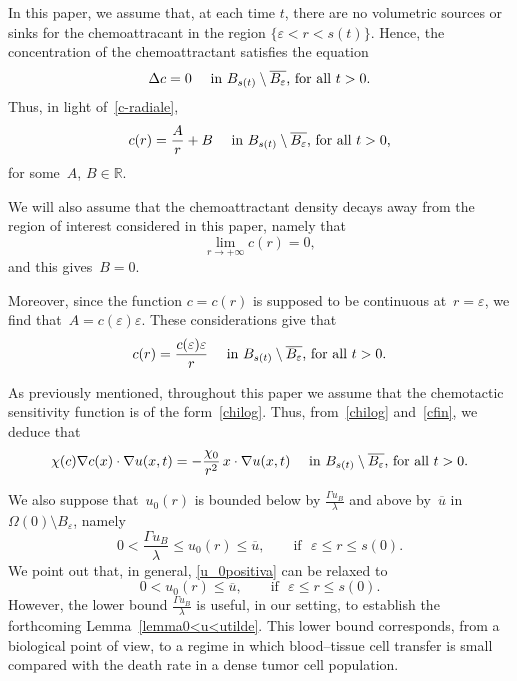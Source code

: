 \documentclass[12pt,a4paper,intlimits,sumlimits]{amsart}
\def \R {\mathbb{R}}
\theoremstyle{definition}
\theoremstyle{plain}
\numberwithin{equation}{section}
\renewcommand{\epsilon}{\varepsilon}
\renewcommand{\leq}{\leqslant}
\renewcommand{\le}{\leqslant}
\begin{document}
In this paper,
we assume that, at each time $t$, there are no volumetric sources or sinks for the chemoattracant in the region $\{\varepsilon < r <s(t)\}$. Hence, the concentration of the chemoattractant satisfies the equation
\begin{equation}
\Delta c =0 \quad\mbox{ in $B_{s(t)}\setminus\overline{B_\varepsilon}$,  for all~$ t>0$.}
\end{equation}
Thus, in light of~\eqref{c-radiale}, 
\begin{equation}
c(r) = \frac{A}{r} + B \quad\mbox{ in $B_{s(t)}\setminus\overline{B_\varepsilon}$, for all~$ t>0$,}
\end{equation}
for some~$A$, $B\in\R$.  

We will also assume that
the chemoattractant density decays away from the region of interest considered in this paper,
namely that
\[
\lim_{r\to +\infty} c(r)=0,
\] and this gives~$B=0$.

Moreover, since the function $c=c(r)$ is supposed to be continuous at~$r=\varepsilon$, we find that~$A=c(\epsilon)\epsilon$.
These considerations give that
\begin{equation}\label{cfin}
c(r) = \frac{c(\varepsilon)\varepsilon}{r} \quad\mbox{ in $B_{s(t)}\setminus\overline{B_\varepsilon}$, for all~$ t>0$.}
\end{equation}

As previously mentioned, throughout this paper we assume that the chemotactic sensitivity function is of the form~\eqref{chilog}.
Thus, from~\eqref{chilog} and~\eqref{cfin}, we deduce that
\begin{equation}\label{evcpbioòdnc}
\chi(c) \nabla c(x)\cdot\nabla u(x, t) = -\frac{\chi_0}{r^2}\, x\cdot\nabla u(x, t) \quad\mbox{ in $B_{s(t)}\setminus\overline{B_\varepsilon}$, for all~$ t>0$.}
\end{equation}

We also suppose that~$u_0(r)$ is bounded below by $\frac{\Gamma u_B}{\lambda}$ and above by~$\overline{u}$ in~$\Omega(0)\setminus B_\varepsilon$, namely
\begin{equation}\label{u_0positiva}
0<\frac{\Gamma u_B}{\lambda}\le u_0(r)\le\overline{u}, \qquad \mbox{if }\,\,\varepsilon\leq r\leq s(0).
\end{equation}
We point out that, in general, \eqref{u_0positiva} can be relaxed to
\[
0< u_0(r)\le\overline{u}, \qquad \mbox{if }\,\,\varepsilon\leq r\leq s(0).
\]
However, the lower bound $\frac{\Gamma u_B}{\lambda}$ is useful, in our setting, to establish the 
forthcoming Lemma~\ref{lemma0<u<utilde}.
This lower bound corresponds, from a biological point of view, to a regime in which blood–tissue cell transfer is small compared with the death rate in a dense tumor cell population. 
\end{document}
